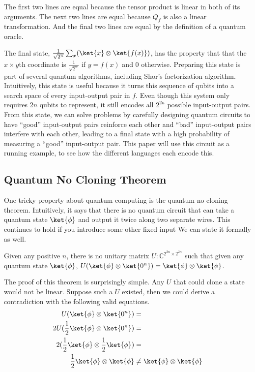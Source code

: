 The first two lines are equal because the tensor product is linear in both of its arguments.
The next two lines are equal because $Q_f$ is also a linear transformation.
And the final two lines are equal by the definition of a quantum oracle.

The final state, $\frac{1}{\sqrt{2^n}}\sum_x (\ket{x} \otimes\ket{f(x)})$, has the property that that the $x \times y$th coordinate is $\frac{1}{\sqrt{2^n}}$ if $y = f(x)$ and $0$ otherwise.
Preparing this state is part of several quantum algorithms, including Shor’s factorization algorithm.
Intuitively, this state is useful because it turns this sequence of qubits into a search space of every input-output pair in $f$.
Even though this system only requires $2n$ qubits to represent, it still encodes all $2^{2n}$ possible input-output pairs.
From this state, we can solve problems by carefully designing quantum circuits to have “good” input-output pairs reinforce each other and “bad” input-output pairs interfere with each other, leading to a final state with a high probability of measuring a “good” input-output pair.
This paper will use this circuit as a running example, to see how the different languages each encode this. 

\subsection{Quantum No Cloning Theorem}
One tricky property about quantum computing is the quantum no cloning theorem.
Intuitively, it says that there is no quantum circuit that can take a quantum state $\ket{\phi}$ and output it twice along two separate wires.
This continues to hold if you introduce some other fixed input
We can state it formally as well.
\begin{theorem}
Given any positive $n$, there is no unitary matrix $U:\mathbb{C}^{2^{2n}\times 2^{2n}}$ such that given any quantum state $\ket{\phi}$,
$U(\ket{\phi}\otimes\ket{0^n}) = \ket{\phi} \otimes \ket{\phi}$.
\end{theorem}
The proof of this theorem is surprisingly simple.
Any $U$ that could clone a state would not be linear.
Suppose such a $U$ existed, then we could derive a contradiction with the following valid equations.
\begin{align*}
U(\ket{\phi}\otimes\ket{0^n}) &=\\
2U(\frac{1}{2}\ket{\phi} \otimes \ket{0^n}) &=\\
2(\frac{1}{2}\ket{\phi} \otimes \frac{1}{2}\ket{\phi}) &=\\
\frac{1}{2} \ket{\phi} \otimes \ket{\phi} &\neq \ket{\phi} \otimes \ket{\phi}
\end{align*}
